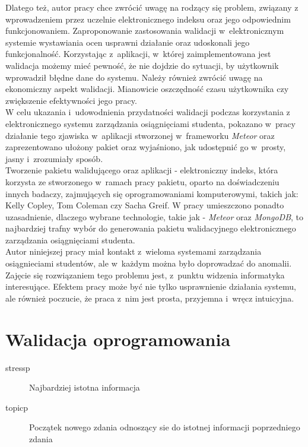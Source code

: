 \documentclass{xmgr}
\begin{document}
\textcolor{wc}{Dlatego też, autor pracy chce zwrócić uwagę na rodzący się problem, związany
z wprowadzeniem przez uczelnie elektronicznego indeksu oraz jego odpowiednim
funkcjonowaniem. Zaproponowanie zastosowania walidacji w~elektronicznym systemie
wystawiania ocen usprawni działanie oraz udoskonali jego funkcjonalność.
Korzystając z~aplikacji, w~której zaimplementowana jest walidacja możemy mieć pewność,
że nie dojdzie do sytuacji, by użytkownik wprowadził błędne dane do systemu.
Należy również zwrócić uwagę na ekonomiczny aspekt walidacji. Mianowicie oszczędność
czasu użytkownika czy zwiększenie efektywności jego pracy.}
\\
\indent \textcolor{wc}{W celu ukazania i~udowodnienia przydatności walidacji podczas korzystania
z elektronicznego systemu zarządzania osiągnięciami studenta, pokazano w~pracy
działanie tego zjawiska w~aplikacji stworzonej w~frameworku \textit{Meteor} oraz
zaprezentowano ułożony pakiet oraz wyjaśniono, jak udostępnić go w~prosty, jasny i~zrozumiały sposób.}
\\
\indent \textcolor{wd}{Tworzenie pakietu walidującego oraz aplikacji - elektroniczny indeks, która korzysta
ze stworzonego w~ramach pracy pakietu, oparto na doświadczeniu innych badaczy,
zajmujących się oprogramowaniami komputerowymi, takich jak: Kelly Copley, Tom
Coleman czy Sacha Greif.} \textcolor{wa}{W pracy umieszczono ponadto uzasadnienie, dlaczego wybrane
technologie, takie jak - \textit{Meteor} oraz \textit{MongoDB}, to najbardziej trafny wybór do generowania
pakietu walidacyjnego elektronicznego zarządzania osiągnięciami studenta.}
\\
\indent \textcolor{wa}{Autor niniejszej pracy miał kontakt z~wieloma systemami zarządzania osiągnieciami
studentów, ale w~każdym można było doprowadzać do anomalii. Zajęcie się rozwiązaniem
tego problemu jest, z~punktu widzenia informatyka interesujące. Efektem pracy może być
nie tylko usprawnienie działania systemu, ale również poczucie, że praca z~nim jest
prosta, przyjemna i~wręcz intuicyjna.}





\chapter{Walidacja oprogramowania}

\begin{description}
\item[stressp] \textcolor{sa}{Najbardziej istotna informacja}
\item[topicp] \textcolor{sb}{Początek nowego zdania odnoszący sie do istotnej informacji poprzedniego zdania}
\end{description}
\end{document}
